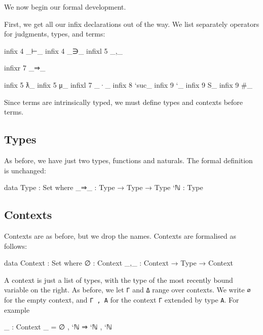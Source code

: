We now begin our formal development.

First, we get all our infix declarations out of the way. We list
separately operators for judgments, types, and terms:

\begin{fence}
\begin{code}
infix  4 _⊢_
infix  4 _∋_
infixl 5 _,_

infixr 7 _⇒_

infix  5 ƛ_
infix  5 μ_
infixl 7 _·_
infix  8 `suc_
infix  9 `_
infix  9 S_
infix  9 #_
\end{code}
\end{fence}

Since terms are intrinsically typed, we must define types and contexts
before terms.

\hypertarget{types}{%
\subsection{Types}\label{types}}

As before, we have just two types, functions and naturals. The formal
definition is unchanged:

\begin{fence}
\begin{code}
data Type : Set where
  _⇒_ : Type → Type → Type
  `ℕ  : Type
\end{code}
\end{fence}

\hypertarget{contexts}{%
\subsection{Contexts}\label{contexts}}

Contexts are as before, but we drop the names. Contexts are formalised
as follows:

\begin{fence}
\begin{code}
data Context : Set where
  ∅   : Context
  _,_ : Context → Type → Context
\end{code}
\end{fence}

A context is just a list of types, with the type of the most recently
bound variable on the right. As before, we let \texttt{Γ} and \texttt{Δ}
range over contexts. We write \texttt{∅} for the empty context, and
\texttt{Γ\ ,\ A} for the context \texttt{Γ} extended by type \texttt{A}.
For example

\begin{fence}
\begin{code}
_ : Context
_ = ∅ , `ℕ ⇒ `ℕ , `ℕ
\end{code}
\end{fence}

